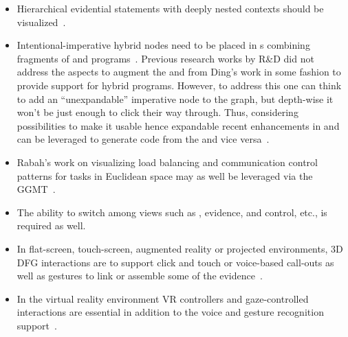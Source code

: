 \begin{itemize}
\item
Hierarchical evidential statements with deeply nested contexts should be 
visualized~\cite{flucid-dfg-viz-pst2011}.

\item
Intentional-imperative hybrid nodes need to be placed in {\dfg}s
combining fragments of {\lucid} and {\java} programs~\cite{flucid-dfg-viz-pst2011}.
%
Previous research works by {\gipsy} R\&D did not address the aspects to 
augment the  and  from Ding's work in some 
fashion to provide support for hybrid {\gipsy} programs. However, to address 
this one can think to add an ``unexpandable'' imperative {\dfg} node to the 
graph, but depth-wise it won't be just enough to click their way through.  
Thus, considering possibilities to make it usable hence expandable recent 
enhancements in {\graphviz} and {\gipsy} can be leveraged to generate {\flucid}
code from the {\dfg} and vice versa~\cite{flucid-dfg-viz-pst2011}.
%


\item
Rabah's work on visualizing load balancing and communication control patterns 
for tasks in Euclidean space may as well be leveraged via the GGMT~\cite{graph-based-gmt}.

\item
The ability to switch among views such as {\dfg}, evidence, and control, 
etc., is required as well.

\item
In flat-screen, touch-screen, augmented reality or projected environments, 3D DFG interactions
are to support click and touch or voice-based call-outs as well as gestures
to link or assemble some of the evidence~\cite{iss-multimodal-case-study-docu-vsmm2014}.

\item
In the virtual reality environment VR controllers and gaze-controlled interactions
are essential in addition to the voice and gesture recognition support~\cite{iss-v3-ar-vr-sa2016}.
\end{itemize}

